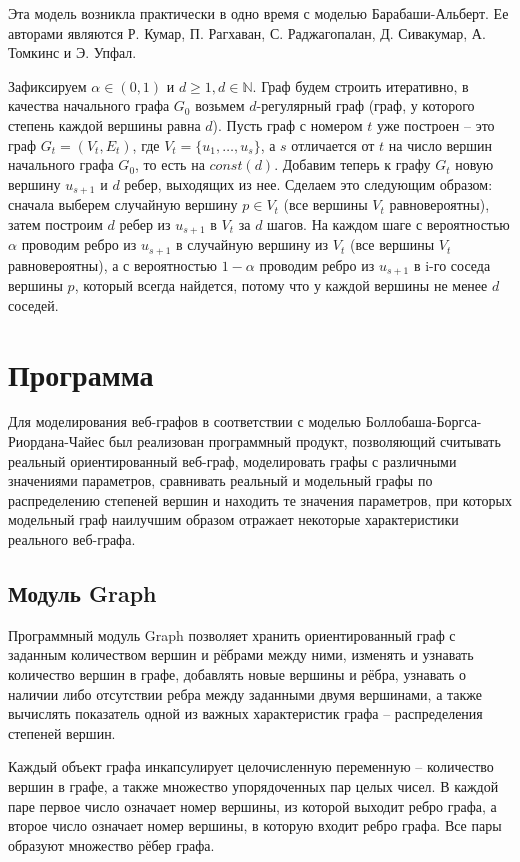 \documentclass[14pt]{extreport}
\begin{document}
Эта модель возникла практически в одно время с моделью Барабаши-Альберт. Ее авторами являются Р. Кумар, П. Рагхаван, С. Раджагопалан, Д. Сивакумар, А. Томкинс и Э. Упфал.

Зафиксируем $\alpha \in (0,1)$ и $d \ge 1, d \in \mathbb{N}$. Граф будем строить итеративно, в качества начального графа $G_0$ возьмем $d$-регулярный граф (граф, у которого степень каждой вершины равна $d$). Пусть граф с номером $t$ уже построен -- это граф $G_t = (V_t, E_t)$, где $V_t = \{u_1, \dots, u_s\}$, а $s$ отличается от $t$ на число вершин начального графа $G_0$, то есть на $const(d)$. Добавим теперь к графу $G_t$ новую вершину $u_{s+1}$ и $d$ ребер, выходящих из нее. Сделаем это следующим образом: сначала выберем случайную вершину $p \in V_t$ (все вершины $V_t$ равновероятны), затем построим $d$ ребер из $u_{s+1}$ в $V_t$ за $d$ шагов. На каждом шаге с вероятностью $\alpha$ проводим ребро из $u_{s+1}$ в случайную вершину из $V_t$ (все вершины $V_t$ равновероятны), а с вероятностью $1-\alpha$ проводим ребро из $u_{s+1}$ в i-го соседа вершины $p$, который всегда найдется, потому что у каждой вершины не менее $d$ соседей. 

\chapter{Программа}

Для моделирования веб-графов в соответствии с моделью Боллобаша-Боргса-Риордана-Чайес был реализован программный продукт, позволяющий считывать реальный ориентированный веб-граф, моделировать графы с различными значениями параметров, сравнивать реальный и модельный графы по распределению степеней вершин и находить те значения параметров, при которых модельный граф наилучшим образом отражает некоторые характеристики реального веб-графа.

\section{Модуль Graph}

Программный модуль Graph позволяет хранить ориентированный граф с заданным количеством вершин и рёбрами между ними, изменять и узнавать количество вершин в графе, добавлять новые вершины и рёбра, узнавать о наличии либо отсутствии ребра между заданными двумя вершинами, а также вычислять показатель одной из важных характеристик графа -- распределения степеней вершин.

Каждый объект графа инкапсулирует целочисленную переменную -- количество вершин в графе, а также множество упорядоченных пар целых чисел. В каждой паре первое число означает номер вершины, из которой выходит ребро графа, а второе число означает номер вершины, в которую входит ребро графа. Все пары образуют множество рёбер графа.
\end{document}
